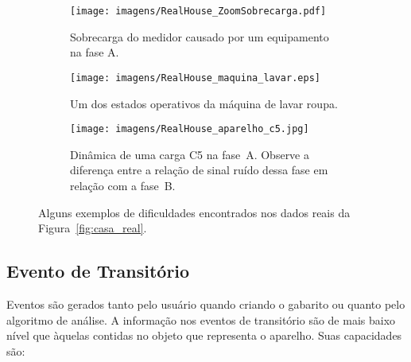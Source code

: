 \begin{figure*}[p!]
  \begin{center}
    \begin{subfigure}[c]{\textwidth}
      \texttt{[image: imagens/RealHouse\_ZoomSobrecarga.pdf]}
      \caption{Sobrecarga do medidor causado por um equipamento na
        fase A.}
      \label{fig:sobrecarga}
    \end{subfigure}
    \hfill
    \begin{subfigure}[c]{\textwidth}
      \texttt{[image: imagens/RealHouse\_maquina\_lavar.eps]}
      \caption{Um dos estados operativos da máquina de lavar
        roupa.}
      \label{fig:maquina_lavar}
    \end{subfigure}
    \hfill
    \begin{subfigure}[c]{\textwidth}
      \texttt{[image: imagens/RealHouse\_aparelho\_c5.jpg]}
      \caption{Dinâmica de uma carga C5 na fase~A. Observe a diferença
entre a relação de sinal ruído dessa fase em relação com a fase~B.}
      \label{fig:c5_ruido}
    \end{subfigure}
  \end{center}
\caption[Alguns exemplos de dificuldades encontrados nos dados reais]{
Alguns exemplos de dificuldades encontrados nos dados reais da
Figura~\ref{fig:casa_real}.}
\label{fig:dificuldades}
\end{figure*}

%


\subsection{Evento de Transitório}
\label{ssec:evento}

Eventos são gerados tanto pelo usuário quando criando o gabarito
ou quanto pelo algoritmo de análise. A informação nos eventos de
transitório são de mais baixo nível que àquelas contidas no objeto que
representa o aparelho. Suas capacidades são: 

